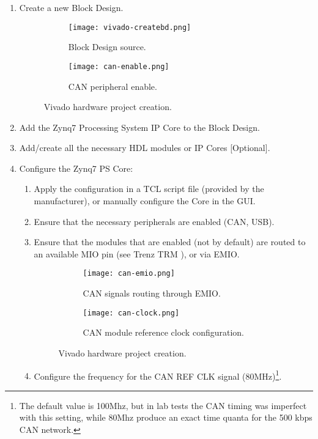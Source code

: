 \begin{enumerate}
	\item Create a new Block Design.
	\begin{figure}[htp]
		\centering
		\begin{subfigure}{0.45\textwidth}
			\texttt{[image: vivado-createbd.png]}
			\caption{Block Design source.} \label{fig:vivado-createbd}
		\end{subfigure} \hfill
		\begin{subfigure}{0.45\textwidth}
			\texttt{[image: can-enable.png]}
			\caption{CAN peripheral enable.} \label{fig:can-enable}
		\end{subfigure}%
		\caption{Vivado hardware project creation.}
	\end{figure}%
	\item Add the Zynq7 Processing System IP Core to the Block Design.
	\item Add/create all the necessary HDL modules or IP Cores [Optional].
	\item Configure the Zynq7 PS Core:
	\begin{enumerate}
		\item Apply the configuration in a TCL script file (provided by the manufacturer), or manually configure the Core in the GUI.
		\item Ensure that the necessary peripherals are enabled (CAN, USB).
		\item Ensure that the modules that are enabled (not by default) are routed to an available MIO pin (see Trenz TRM \cite{zynq-trm}), or via EMIO.
		\begin{figure}[htp]
			\centering
			\begin{subfigure}{0.45\textwidth}
				\texttt{[image: can-emio.png]}
				\caption{CAN signals routing through EMIO.} \label{fig:can-emio}
			\end{subfigure} \hfill
			\begin{subfigure}{0.45\textwidth}
				\texttt{[image: can-clock.png]}
				\caption{CAN module reference clock configuration.} \label{fig:can-clock}
			\end{subfigure}%
			\caption{Vivado hardware project creation.}
		\end{figure}%
		\item Configure the frequency for the CAN REF CLK signal (80MHz)\footnote{The default value is 100Mhz, but in lab tests the CAN timing was imperfect with this setting, while 80Mhz produce an exact time quanta for the 500 kbps CAN network.}.

\end{enumerate}
\end{enumerate}
